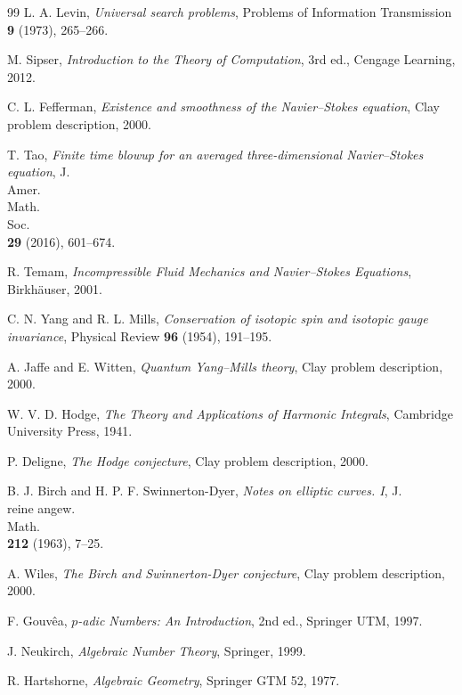 \documentclass[11pt,a4paper]{book}
\theoremstyle{definition}
\begin{document}
\begin{thebibliography}{99}
 L. A. Levin, \textit{Universal search problems}, Problems of Information Transmission \textbf{9} (1973), 265--266.

 M. Sipser, \textit{Introduction to the Theory of Computation}, 3rd ed., Cengage Learning, 2012.

 C. L. Fefferman, \textit{Existence and smoothness of the Navier--Stokes equation}, Clay problem description, 2000.

 T. Tao, \textit{Finite time blowup for an averaged three-dimensional Navier--Stokes equation}, J.\\ Amer.\\ Math.\\ Soc.\\ \textbf{29} (2016), 601--674.

 R. Temam, \textit{Incompressible Fluid Mechanics and Navier--Stokes Equations}, Birkh\"{a}user, 2001.

 C. N. Yang and R. L. Mills, \textit{Conservation of isotopic spin and isotopic gauge invariance}, Physical Review \textbf{96} (1954), 191--195.

 A. Jaffe and E. Witten, \textit{Quantum Yang--Mills theory}, Clay problem description, 2000.

 W. V. D. Hodge, \textit{The Theory and Applications of Harmonic Integrals}, Cambridge University Press, 1941.

 P. Deligne, \textit{The Hodge conjecture}, Clay problem description, 2000.

 B. J. Birch and H. P. F. Swinnerton-Dyer, \textit{Notes on elliptic curves. I}, J.\\ reine angew.\\ Math.\\ \textbf{212} (1963), 7--25.

 A. Wiles, \textit{The Birch and Swinnerton-Dyer conjecture}, Clay problem description, 2000.

 F. Gouv\^{e}a, \textit{$p$-adic Numbers: An Introduction}, 2nd ed., Springer UTM, 1997.

 J. Neukirch, \textit{Algebraic Number Theory}, Springer, 1999.

 R. Hartshorne, \textit{Algebraic Geometry}, Springer GTM 52, 1977.

\end{thebibliography}

\printindex
\end{document}
